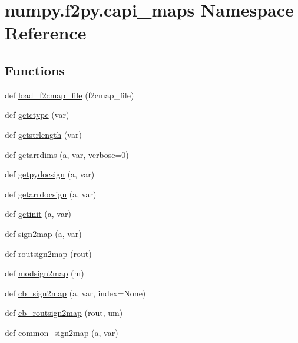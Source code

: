 \hypertarget{namespacenumpy_1_1f2py_1_1capi__maps}{}\section{numpy.\+f2py.\+capi\+\_\+maps Namespace Reference}
\label{namespacenumpy_1_1f2py_1_1capi__maps}
\subsection*{Functions}
\begin{DoxyCompactItemize}
\item 
def \hyperlink{namespacenumpy_1_1f2py_1_1capi__maps_a6dea841d16f3b99a350c421cc54aeb89}{load\+\_\+f2cmap\+\_\+file} (f2cmap\+\_\+file)
\item 
def \hyperlink{namespacenumpy_1_1f2py_1_1capi__maps_aa26446be44183d4b569c882ac31e8b3e}{getctype} (var)
\item 
def \hyperlink{namespacenumpy_1_1f2py_1_1capi__maps_a529948cb940e07496e887688bb298ec8}{getstrlength} (var)
\item 
def \hyperlink{namespacenumpy_1_1f2py_1_1capi__maps_ac68e251b65e8c5b1322fe831e8228545}{getarrdims} (a, var, verbose=0)
\item 
def \hyperlink{namespacenumpy_1_1f2py_1_1capi__maps_ae4eb640c259c43f265efd179cbe196d2}{getpydocsign} (a, var)
\item 
def \hyperlink{namespacenumpy_1_1f2py_1_1capi__maps_a7f076025c8366db33c404ce84f43b27d}{getarrdocsign} (a, var)
\item 
def \hyperlink{namespacenumpy_1_1f2py_1_1capi__maps_ad04917b9682d15a06c834db304888651}{getinit} (a, var)
\item 
def \hyperlink{namespacenumpy_1_1f2py_1_1capi__maps_a7453a2f2b126df1f9bcfcd858e7a496c}{sign2map} (a, var)
\item 
def \hyperlink{namespacenumpy_1_1f2py_1_1capi__maps_a8b618cb32809f41049108da3cf8d336b}{routsign2map} (rout)
\item 
def \hyperlink{namespacenumpy_1_1f2py_1_1capi__maps_a5272c50d5977a683bcaffea069b112ed}{modsign2map} (m)
\item 
def \hyperlink{namespacenumpy_1_1f2py_1_1capi__maps_a85bf6e3a35de63dd40c1764fd63ef4c7}{cb\+\_\+sign2map} (a, var, index=None)
\item 
def \hyperlink{namespacenumpy_1_1f2py_1_1capi__maps_a0b1bc421be697055fd43674f1f0ec0b6}{cb\+\_\+routsign2map} (rout, um)
\item 
def \hyperlink{namespacenumpy_1_1f2py_1_1capi__maps_a9f6dd0c9bf072205714fec1664ed5487}{common\+\_\+sign2map} (a, var)
\end{DoxyCompactItemize}
